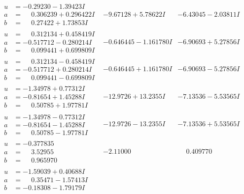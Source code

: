\documentclass[1p]{elsarticle_modified}
\theoremstyle{definition}
\begin{document}
$$\begin{array}{c|c|c}
\begin{aligned}
u &= -0.29230 - 1.39423 I \\
a &= \phantom{-}0.306239 + 0.296422 I \\
b &= \phantom{-}0.27422 + 1.73853 I\end{aligned}
 & -9.67128 + 5.78622 I & -6.43045 - 2.03811 I \\ \hline\begin{aligned}
u &= \phantom{-}0.312134 + 0.458419 I \\
a &= -0.517712 - 0.280214 I \\
b &= \phantom{-}0.099441 + 0.699809 I\end{aligned}
 & -0.646445 - 1.161780 I & -6.90693 + 5.27856 I \\ \hline\begin{aligned}
u &= \phantom{-}0.312134 - 0.458419 I \\
a &= -0.517712 + 0.280214 I \\
b &= \phantom{-}0.099441 - 0.699809 I\end{aligned}
 & -0.646445 + 1.161780 I & -6.90693 - 5.27856 I \\ \hline\begin{aligned}
u &= -1.34978 + 0.77312 I \\
a &= -0.81654 + 1.45288 I \\
b &= \phantom{-}0.50785 + 1.97781 I\end{aligned}
 & -12.9726 + 13.2355 I & -7.13536 - 5.53565 I \\ \hline\begin{aligned}
u &= -1.34978 - 0.77312 I \\
a &= -0.81654 - 1.45288 I \\
b &= \phantom{-}0.50785 - 1.97781 I\end{aligned}
 & -12.9726 - 13.2355 I & -7.13536 + 5.53565 I \\ \hline\begin{aligned}
u &= -0.377835\phantom{ +0.000000I} \\
a &= \phantom{-}3.52955\phantom{ +0.000000I} \\
b &= \phantom{-}0.965970\phantom{ +0.000000I}\end{aligned}
 & -2.11000\phantom{ +0.000000I} & \phantom{-}0.409770\phantom{ +0.000000I} \\ \hline\begin{aligned}
u &= -1.59039 + 0.40688 I \\
a &= \phantom{-}0.35471 - 1.57413 I \\
b &= -0.18308 - 1.79179 I\end{aligned}

\end{array}$$
\end{document}

